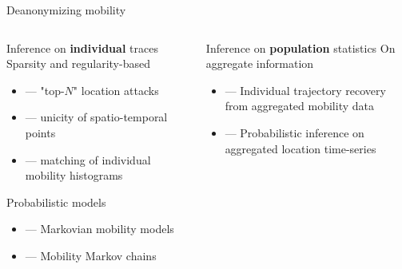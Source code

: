 \documentclass[hyperref={colorlinks = true},unknownkeysallowed]{beamer}
\let\oldcitep=\citep
\renewcommand\citep[1]{\hypersetup{linkcolor=UBCblue}\hyperlink{#1}{\oldcitep{#1}}}
\begin{document}
\begin{frame}{Deanonymizing mobility}
	\begin{columns}
		\begin{column}[t]{0.5\textwidth}
	\begin{block}{Inference on \textbf{individual}  traces }
	 Sparsity and regularity-based \\
	\begin{itemize}
		\item --- "top-$N$" location attacks {\footnotesize \citep{Zang2011}}
		\item --- unicity of spatio-temporal points {\footnotesize \citep{DeMontjoye2013}}
		\item --- matching of individual mobility histograms {\footnotesize \citep{Naini2016a}}
	\end{itemize}
	 Probabilistic models \\
\begin{itemize}
	\item --- Markovian mobility models {\footnotesize \citep{deMulder08}}
	\item --- Mobility Markov chains {\footnotesize \citep{Gambs2014}}
\end{itemize}
\end{block}			
\end{column}
\pause
\begin{column}[t]{0.5\textwidth}
\begin{block}{Inference on \textbf{population} statistics}
	 On aggregate information\\
	\begin{itemize}
		\item --- Individual trajectory recovery from aggregated mobility data {\footnotesize \citep{xu2017trajectory}}
		\item --- Probabilistic inference on aggregated location time-series {\footnotesize \citep{pyrgelis2017does}}
	\end{itemize}
\end{block}
		\end{column}
	\end{columns}
\end{frame}
\end{document}
